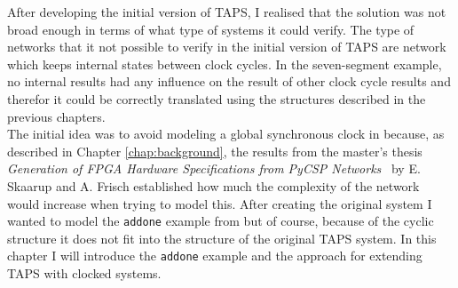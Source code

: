 After developing the initial version of TAPS, I realised that the solution was not broad enough in terms of what type of systems it could verify. The type of networks that it not possible to verify in the initial version of TAPS are network which keeps internal states between clock cycles. In the seven-segment example, no internal results had any influence on the result of other clock cycle results and therefor it could be correctly translated using the structures described in the previous chapters. \\

The initial idea was to avoid modeling a global synchronous clock in \cspm{} because, as described in Chapter \ref{chap:background}, the results from the master's thesis \textit{Generation of FPGA Hardware
Specifications from PyCSP Networks}~\cite{Skaarup14} by E. Skaarup and A. Frisch established how much the complexity of the network would increase when trying to model this. After creating the original system I wanted to model the \texttt{addone} example from \cite{smeil} but of course, because of the cyclic structure it does not fit into the structure of the original TAPS system. In this chapter I will introduce the \texttt{addone} example and the approach for extending TAPS with clocked systems.



%
%
%
%

